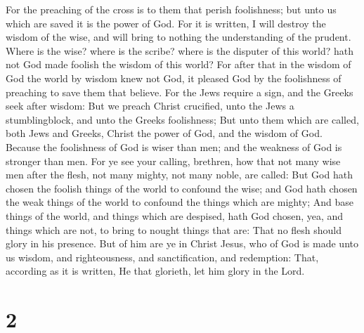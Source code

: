  For the preaching of the cross is to them that perish
foolishness; but unto us which are saved it is the power of God.
 For it is written, I will destroy the wisdom of the wise,
and will bring to nothing the understanding of the prudent.
 Where is the wise? where is the scribe? where is the
disputer of this world? hath not God made foolish the wisdom of this
world?  For after that in the wisdom of God the world by
wisdom knew not God, it pleased God by the foolishness of preaching to
save them that believe.  For the Jews require a sign, and
the Greeks seek after wisdom:  But we preach Christ
crucified, unto the Jews a stumblingblock, and unto the Greeks
foolishness;  But unto them which are called, both Jews and
Greeks, Christ the power of God, and the wisdom of God. 
Because the foolishness of God is wiser than men; and the weakness of
God is stronger than men.  For ye see your calling,
brethren, how that not many wise men after the flesh, not many mighty,
not many noble, are called:  But God hath chosen the
foolish things of the world to confound the wise; and God hath chosen
the weak things of the world to confound the things which are mighty;
 And base things of the world, and things which are
despised, hath God chosen, yea, and things which are not, to bring to
nought things that are:  That no flesh should glory in his
presence.  But of him are ye in Christ Jesus, who of God is
made unto us wisdom, and righteousness, and sanctification, and
redemption:  That, according as it is written, He that
glorieth, let him glory in the Lord.

\hypertarget{section-1}{%
\section{2}\label{section-1}}

